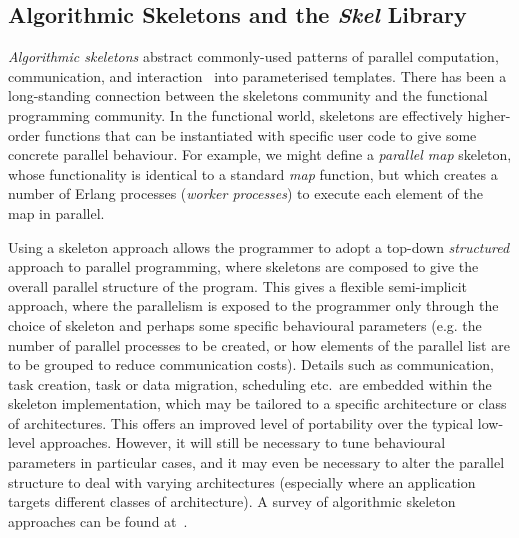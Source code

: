 \documentclass[final]{jfp1}
\begin{document}
\subsection{Algorithmic Skeletons and the \emph{Skel} Library}\label{sec:skeletons}


\noindent
\emph{Algorithmic skeletons} abstract commonly-used patterns of parallel
computation, communication, and
interaction~\cite{cole-th,cole:manifesto:02} into parameterised
templates.  There has been a long-standing connection between the
skeletons community and the functional programming community.  In the
functional world, skeletons are effectively higher-order functions that
can be instantiated with specific user code to give some concrete
parallel behaviour. For example, we might define a \emph{parallel map}
skeleton, whose functionality is identical to a standard \emph{map}
function, but which creates a number of Erlang processes (\emph{worker
processes}) to execute each element of
the map in parallel.  

Using a skeleton approach allows the programmer to adopt a top-down
\emph{structured} approach to parallel programming, where skeletons are
composed to give the overall parallel structure of the program.
This gives a flexible semi-implicit approach, where the
parallelism is exposed to the programmer only through the choice of
skeleton and perhaps some specific behavioural parameters (e.g. the
number of parallel processes to be created, or how elements of the parallel
list are to be grouped to reduce communication costs).  Details such as
communication, task creation, task or data migration, scheduling etc.~are
embedded within the skeleton implementation, which may be tailored to a
specific architecture or class of architectures.  This offers an improved
level of portability over the typical low-level approaches. 
However, it will still be necessary to tune behavioural
parameters in particular cases, and it may even be necessary to alter
the parallel structure to deal with varying architectures (especially
where an application targets different classes of architecture).
A %
survey of algorithmic skeleton approaches can be found at~\cite{SkelSurvey}.
\end{document}
